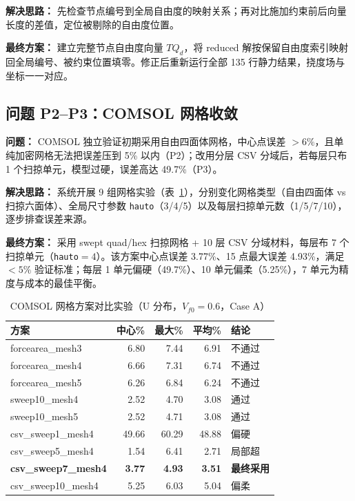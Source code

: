 \documentclass[11pt,a4paper]{ctexart}
\begin{document}
\textbf{解决思路：} 先检查节点编号到全局自由度的映射关系；再对比施加约束前后向量长度的差值，定位被剔除的自由度位置。

\textbf{最终方案：} 建立完整节点自由度向量 $TQ_d$，将 reduced 解按保留自由度索引映射回全局编号、被约束位置填零。修正后重新运行全部 135 行静力结果，挠度场与坐标一一对应。

\subsection{问题 P2--P3：COMSOL 网格收敛}

\textbf{问题：} COMSOL 独立验证初期采用自由四面体网格，中心点误差 $>6\%$，且单纯加密网格无法把误差压到 5\% 以内（P2）；改用分层 CSV 分域后，若每层只布 1 个扫掠单元，模型过硬，误差高达 49.7\%（P3）。

\textbf{解决思路：} 系统开展 9 组网格实验（表~\ref{tab:comsol-experiments}），分别变化网格类型（自由四面体 vs 扫掠六面体）、全局尺寸参数 \texttt{hauto}（3/4/5）以及每层扫掠单元数（1/5/7/10），逐步排查误差来源。

\textbf{最终方案：} 采用 swept quad/hex 扫掠网格 + 10 层 CSV 分域材料，每层布 7 个扫掠单元（\texttt{hauto}$=4$）。该方案中心点误差 3.77\%、15 点最大误差 4.93\%，满足 $<5\%$ 验证标准；每层 1 单元偏硬（49.7\%）、10 单元偏柔（5.25\%），7 单元为精度与成本的最佳平衡。

\begin{table}[H]
\centering
\caption{COMSOL 网格方案对比实验（U 分布，$V_{f0}=0.6$，Case A）}
\label{tab:comsol-experiments}
\small
\begin{tabular}{p{3.8cm}rrrl}
\toprule
\textbf{方案} & \textbf{中心\%} & \textbf{最大\%} & \textbf{平均\%} & \textbf{结论} \\
\midrule
forcearea\_mesh3 & 6.80 & 7.44 & 6.91 & \textcolor{failred}{不通过} \\
forcearea\_mesh4 & 6.66 & 7.31 & 6.74 & \textcolor{failred}{不通过} \\
forcearea\_mesh5 & 6.26 & 6.84 & 6.24 & \textcolor{failred}{不通过} \\
sweep10\_mesh4 & 2.52 & 4.70 & 3.08 & \textcolor{passgreen}{通过} \\
sweep10\_mesh5 & 2.52 & 4.71 & 3.08 & \textcolor{passgreen}{通过} \\
csv\_sweep1\_mesh4 & 49.66 & 60.29 & 48.88 & \textcolor{failred}{偏硬} \\
csv\_sweep5\_mesh4 & 1.54 & 6.41 & 2.71 & \textcolor{warnblue}{局部超} \\
\rowcolor{lightgray}\textbf{csv\_sweep7\_mesh4} & \textbf{3.77} & \textbf{4.93} & \textbf{3.51} & \textcolor{passgreen}{\textbf{最终采用}} \\
csv\_sweep10\_mesh4 & 5.25 & 6.03 & 5.04 & \textcolor{failred}{偏柔} \\
\bottomrule
\end{tabular}
\end{table}
\end{document}
